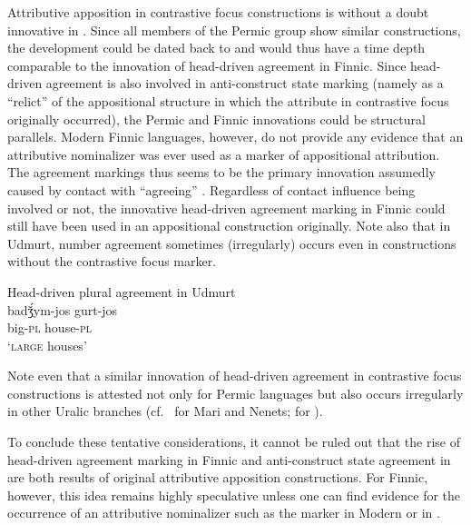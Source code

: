{
Attributive apposition in contrastive focus constructions is without a doubt innovative in . Since all members of the Permic group show similar constructions, the development could be dated back to  and would thus have a time depth comparable to the innovation of head\hyp{}driven agreement in Finnic. Since head\hyp{}driven agreement is also involved in  anti\hyp{}construct state marking (namely as a “relict” of the appositional structure in which the attribute in contrastive focus originally occurred), the Permic and Finnic innovations could be structural parallels. Modern Finnic languages, however, do not provide any evidence that an attributive nominalizer was ever used as a marker of appositional attribution. The agreement markings thus seems to be the primary innovation assumedly caused by contact with “agreeing” . Regardless of contact influence being involved or not, the innovative head\hyp{}driven agreement marking in Finnic could still have been used in an appositional construction originally. Note also that in Udmurt, number agreement sometimes (irregularly) occurs even in constructions without the contrastive focus marker.
\begin{exe}
\ex \rm{Head\hyp{}driven plural agreement in Udmurt \citep{winkler2001}}\\
\gll	badǯ́ym-jos gurt-jos\\
	big-\textsc{pl} house-\textsc{pl}\\
\glt	‘\textsc{large} houses’
\end{exe}
Note even that a similar innovation of head\hyp{}driven agreement in contrastive focus constructions is attested not only for Permic languages but also occurs irregularly in other Uralic branches (cf.~\citealt[136–138, 142]{honti1997} for Mari and Nenets; \citealt[177]{siegl2013a} for ).

To conclude these tentative considerations, it cannot be ruled out that the rise of head\hyp{}driven agreement marking in Finnic and anti\hyp{}construct state agreement in  are both results of original attributive apposition constructions. For Finnic, however, this idea remains highly speculative unless one can find evidence for the occurrence of an attributive nominalizer such as the marker in Modern  or in .

}
